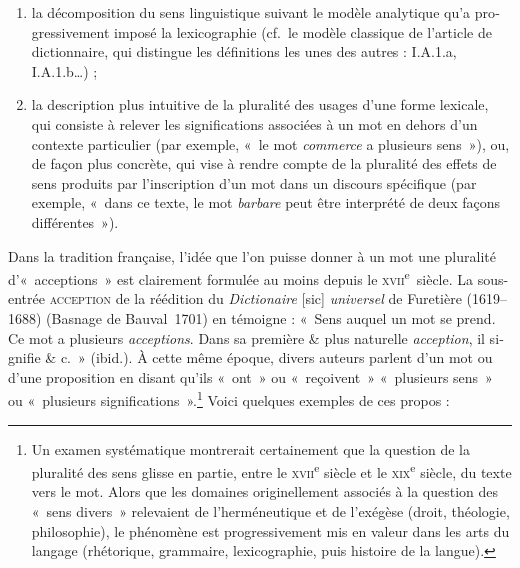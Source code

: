 \documentclass[output=paper]{langsci/langscibook}
\begin{document}
\begin{otherlanguage}{french}
\begin{enumerate}
\item la décomposition du sens linguistique suivant le modèle analytique qu’a progressivement imposé la lexicographie (cf.~le modèle classique de l’article de dictionnaire, qui distingue les définitions les unes des autres : I.A.1.a, I.A.1.b…) ;

\item la description plus intuitive de la pluralité des usages d’une forme lexicale, qui consiste à relever les significations associées à un mot en dehors d’un contexte particulier (par exemple, «~le mot \textit{commerce} a plusieurs sens~»), ou, de façon plus concrète, qui vise à rendre compte de la pluralité des effets de sens produits par l’inscription d’un mot dans un discours spécifique (par exemple, «~dans ce texte, le mot \textit{barbare} peut être interprété de deux façons différentes~»).
\end{enumerate}

Dans la tradition française, l’idée que l’on puisse donner à un mot une pluralité d’«~acceptions~» est clairement formulée au moins depuis le \textsc{xvii}\textsuperscript{e}~siècle. La sous-entrée \textsc{acception} de la réédition du \textit{Dictionaire} [sic] \textit{universel} de Furetière (1619--1688) (Basnage de Bauval~1701) en témoigne : «~Sens auquel un mot se prend. Ce mot a plusieurs \textit{acceptions}. Dans sa première \& plus naturelle \textit{acception}, il signifie \& c.~» (ibid.). À cette même époque, divers auteurs parlent d’un mot ou d’une proposition en disant qu’ils «~ont~» ou «~reçoivent~» «~plusieurs sens~» ou «~plusieurs significations~».\footnote{Un examen systématique montrerait certainement que la question de la pluralité des sens glisse en partie, entre le \textsc{xvii}\textsuperscript{e} siècle et le  \textsc{xix}\textsuperscript{e} siècle, du texte vers le mot. Alors que les domaines originellement associés à la question des «~sens divers~» relevaient de l’herméneutique et de l’exégèse (droit, théologie, philosophie), le phénomène est progressivement mis en valeur dans les arts du langage (rhétorique, grammaire, lexicographie, puis histoire de la langue).} Voici quelques exemples de ces propos :


\end{otherlanguage}
\end{document}
